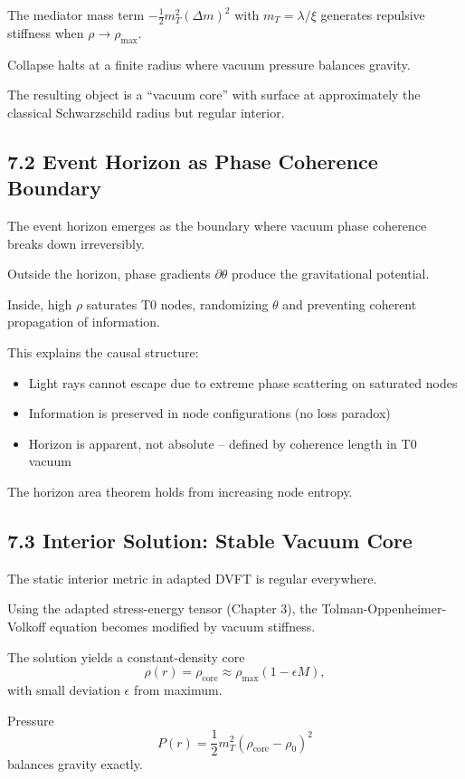 \documentclass[12pt,a4paper]{article}
\begin{document}
	The mediator mass term $-\frac{1}{2} m_T^2 (\Delta m)^2$ with $m_T = \lambda / \xi$ generates repulsive stiffness when $\rho \to \rho_{\text{max}}$.
	
	Collapse halts at a finite radius where vacuum pressure balances gravity.
	
	The resulting object is a ``vacuum core'' with surface at approximately the classical Schwarzschild radius but regular interior.
	
	\subsection{7.2 Event Horizon as Phase Coherence Boundary}
	
	The event horizon emerges as the boundary where vacuum phase coherence breaks down irreversibly.
	
	Outside the horizon, phase gradients $\partial \theta$ produce the gravitational potential.
	
	Inside, high $\rho$ saturates T0 nodes, randomizing $\theta$ and preventing coherent propagation of information.
	
	This explains the causal structure:
	\begin{itemize}
		\item Light rays cannot escape due to extreme phase scattering on saturated nodes
		\item Information is preserved in node configurations (no loss paradox)
		\item Horizon is apparent, not absolute – defined by coherence length in T0 vacuum
	\end{itemize}
	
	The horizon area theorem holds from increasing node entropy.
	
	\subsection{7.3 Interior Solution: Stable Vacuum Core}
	
	The static interior metric in adapted DVFT is regular everywhere.
	
	Using the adapted stress-energy tensor (Chapter 3), the Tolman-Oppenheimer-Volkoff equation becomes modified by vacuum stiffness.
	
	The solution yields a constant-density core
	\[
	\rho(r) = \rho_{\text{core}} \approx \rho_{\text{max}} (1 - \epsilon M),
	\]
	with small deviation $\epsilon$ from maximum.
	
	Pressure
	\[
	P(r) = \frac{1}{2} m_T^2 (\rho_{\text{core}} - \rho_0)^2
	\]
	balances gravity exactly.
	
\end{document}
